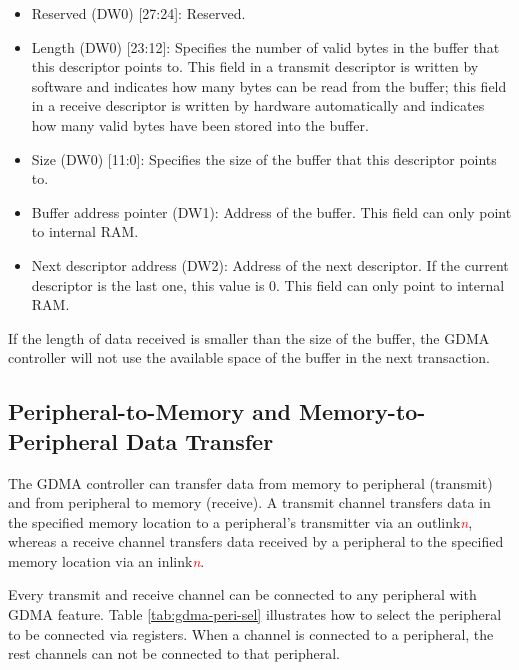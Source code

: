\documentclass[main\_\_EN.tex]{subfiles}
\begin{document}
\begin{itemize}
    \item Reserved (DW0) [27:24]: Reserved.
    \item Length (DW0) [23:12]: Specifies the number of valid bytes in the buffer that this descriptor points to. This field in a transmit descriptor is written by software and indicates how many bytes can be read from the buffer; this field in a receive descriptor is written by hardware automatically and indicates how many valid bytes have been stored into the buffer.
    \item Size (DW0) [11:0]: Specifies the size of the buffer that this descriptor points to.
    \item Buffer address pointer (DW1): Address of the buffer. This field can only point to internal RAM.
    \item Next descriptor address (DW2): Address of the next descriptor. If the current descriptor is the last one, this value is 0. This field can only point to internal RAM.
\end{itemize}

If the length of data received is smaller than the size of the buffer, the GDMA controller will not use the available space of the buffer in the next transaction.

\subsection{Peripheral-to-Memory and Memory-to-Peripheral Data Transfer}

The GDMA controller can transfer data from memory to peripheral (transmit) and from peripheral to memory (receive). A transmit channel transfers data in the specified memory location to a peripheral's transmitter via an outlink\textcolor{red}{\it{n}}, whereas a receive channel transfers data received by a peripheral to the specified memory location via an inlink\textcolor{red}{\it{n}}.

Every transmit and receive channel can be connected to any peripheral with GDMA feature. Table \ref{tab:gdma-peri-sel} illustrates how to select the peripheral to be connected via registers. When a channel is connected to a peripheral, the rest channels can not be connected to that peripheral.
\end{document}

